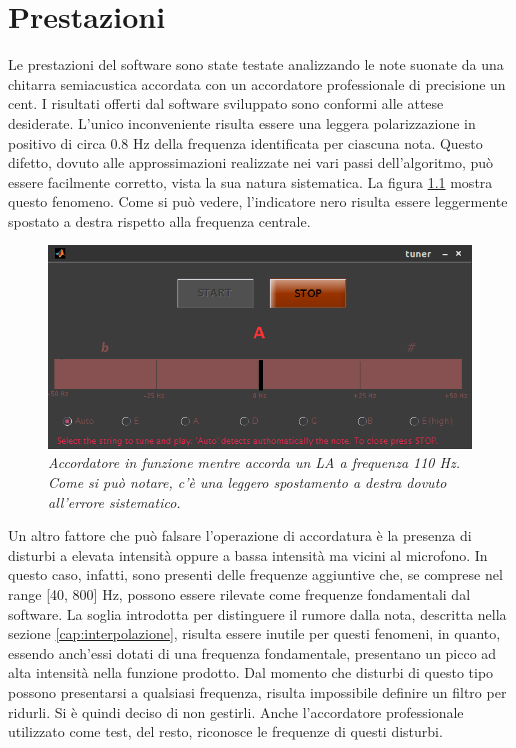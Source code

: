\chapter{Prestazioni}\label{cap:prestazioni}

Le prestazioni del software sono state testate analizzando le note suonate da una chitarra semiacustica accordata con un accordatore professionale di precisione un cent.
I risultati offerti dal software sviluppato sono conformi alle attese desiderate.
L'unico inconveniente risulta essere una leggera polarizzazione in positivo di circa 0.8 Hz della frequenza identificata per ciascuna nota.
Questo difetto, dovuto alle approssimazioni realizzate nei vari passi dell'algoritmo, può essere facilmente corretto, vista la sua natura sistematica.
La figura \ref{fig:accordatore_in_funzione} mostra questo fenomeno.
Come si può vedere, l'indicatore nero risulta essere leggermente spostato a destra rispetto alla frequenza centrale. 

\begin{figure}[h]
  \begin{center} 
    \includegraphics[width=\textwidth*\real{0.8}]{images/ch_08/prestazioni.png}
  \end{center} 
  \caption{\textit{Accordatore in funzione mentre accorda un LA a frequenza 110 Hz. Come si può notare, c'è una leggero spostamento a destra dovuto all'errore sistematico.}}  
  \label{fig:accordatore_in_funzione}
\end{figure}

Un altro fattore che può falsare l'operazione di accordatura è la presenza di disturbi a elevata intensità oppure a bassa intensità ma vicini al microfono. 
In questo caso, infatti, sono presenti delle frequenze aggiuntive che, se comprese nel range [40, 800] Hz, possono essere rilevate come frequenze fondamentali dal software.
La soglia introdotta per distinguere il rumore dalla nota, descritta nella sezione \ref{cap:interpolazione}, risulta essere inutile per questi fenomeni, in quanto, essendo anch'essi dotati di una frequenza fondamentale, presentano un picco ad alta intensità nella funzione prodotto. 
Dal momento che disturbi di questo tipo possono presentarsi a qualsiasi frequenza, risulta impossibile definire un filtro per ridurli. 
Si è quindi deciso di non gestirli.
Anche l'accordatore professionale utilizzato come test, del resto, riconosce le frequenze di questi disturbi.
 
